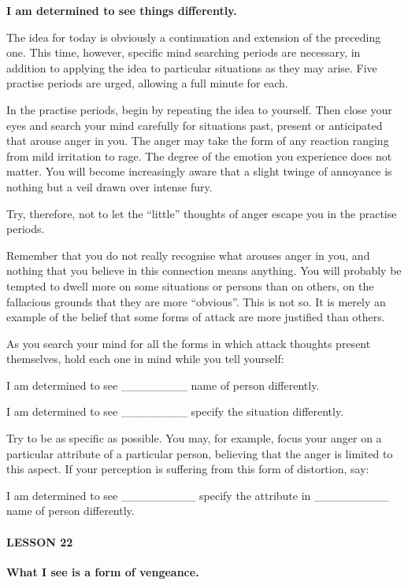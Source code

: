 \textbf{I am determined to see things differently.}

The idea for today is obviously a continuation and extension of the preceding one. This time, however, specific mind searching periods are necessary, in addition to applying the idea to particular situations as they may arise. Five practise periods are urged, allowing a full minute for each.

In the practise periods, begin by repeating the idea to yourself. Then close your eyes and search your mind carefully for situations past, present or anticipated that arouse anger in you. The anger may take the form of any reaction ranging from mild irritation to rage. The degree of the emotion you experience does not matter. You will become increasingly aware that a slight twinge of annoyance is nothing but a veil drawn over intense fury.

Try, therefore, not to let the ``little'' thoughts of anger escape you in the practise periods.

Remember that you do not really recognise what arouses anger in you, and nothing that you believe in this connection means anything. You will probably be tempted to dwell more on some situations or persons than on others, on the fallacious grounds that they are more ``obvious''. This is not so. It is merely an example of the belief that some forms of attack are more justified than others.

As you search your mind for all the forms in which attack thoughts present themselves, hold each one in mind while you tell yourself:

I am determined to see \_\_\_\_\_\_\_\_ name of person differently.

I am determined to see \_\_\_\_\_\_\_\_ specify the situation differently.

Try to be as specific as possible. You may, for example, focus your anger on a particular attribute of a particular person, believing that the anger is limited to this aspect. If your perception is suffering from this form of distortion, say:

I am determined to see \_\_\_\_\_\_\_\_\_ specify the attribute in \_\_\_\_\_\_\_\_\_ name of person differently.


\paragraph{LESSON 22}


\textbf{What I see is a form of vengeance.}



